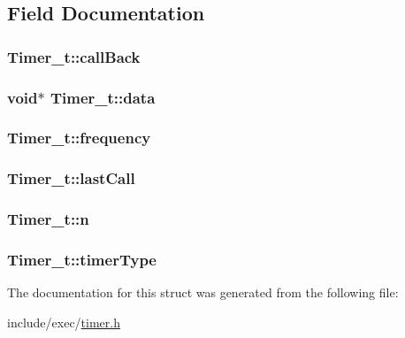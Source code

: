 \subsection{Field Documentation}
\hypertarget{structTimer__t_a33c0f386f5764104c03581b350480fb2}{
\subsubsection[{call\+Back}]{ Timer\+\_\+t\+::call\+Back}}\label{structTimer__t_a33c0f386f5764104c03581b350480fb2}
\hypertarget{structTimer__t_a9de9f00a3de549669d10703a2fe82700}{
\subsubsection[{data}]{\setlength{\rightskip}{0pt plus 5cm}void$\ast$ Timer\+\_\+t\+::data}}\label{structTimer__t_a9de9f00a3de549669d10703a2fe82700}
\hypertarget{structTimer__t_aa70a6bd0e8333ae2245c412704faa357}{
\subsubsection[{frequency}]{ Timer\+\_\+t\+::frequency}}\label{structTimer__t_aa70a6bd0e8333ae2245c412704faa357}
\hypertarget{structTimer__t_a94aa32e419e8a720f13ec257f58587fc}{
\subsubsection[{last\+Call}]{ Timer\+\_\+t\+::last\+Call}}\label{structTimer__t_a94aa32e419e8a720f13ec257f58587fc}
\hypertarget{structTimer__t_affec7fa3a3a0590d323226c36ff15306}{
\subsubsection[{n}]{ Timer\+\_\+t\+::n}}\label{structTimer__t_affec7fa3a3a0590d323226c36ff15306}
\hypertarget{structTimer__t_a0d9bfe383c4d6298247ed58db898516d}{
\subsubsection[{timer\+Type}]{ Timer\+\_\+t\+::timer\+Type}}\label{structTimer__t_a0d9bfe383c4d6298247ed58db898516d}


The documentation for this struct was generated from the following file\+:\begin{DoxyCompactItemize}
\item 
include/exec/\hyperlink{timer_8h}{timer.\+h}\end{DoxyCompactItemize}
